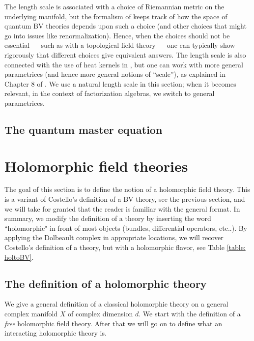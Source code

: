 \documentclass[10pt]{amsart}
\begin{document}
\begin{rmk}
The length scale is associated with a choice of Riemannian metric on the underlying manifold,
but the formalism of \cite{CostelloRenormalization} keeps track of how the space of quantum BV theories depends upon such a choice 
(and other choices that might go into issues like renormalization).
Hence, when the choices should not be essential --- such as with a topological field theory --- one can typically show rigorously that different choices give equivalent answers.
The length scale is also connected with the use of heat kernels in \cite{CostelloRenormalization},
but one can work with more general parametrices (and hence more general notions of ``scale''),
as explained in Chapter 8 of \cite{CG2}.
We use a natural length scale in this section; 
when it becomes relevant, in the context of factorization algebras, we switch to general parametrices.
\end{rmk}

\subsection{The quantum master equation}

\section{Holomorphic field theories}

The goal of this section is to define the notion of a holomorphic field theory. 
This is a variant of Costello's definition of a BV theory, see the previous section, and we will take for granted that the reader is familiar with the general format.
In summary, we modify the definition of a theory by inserting the word ``holomorphic" in front of most objects (bundles, differential operators, etc..).
By applying the Dolbeault complex in appropriate locations, we will recover Costello's definition of a theory, but with a holomorphic flavor, see Table \ref{table: holtoBV}. 

\subsection{The definition of a holomorphic theory}

We give a general definition of a classical holomorphic theory on a general complex manifold $X$ of complex dimension $d$.
We start with the definition of a {\em free} holomorphic field theory. 
After that we will go on to define what an interacting holomorphic theory is.
\end{document}
